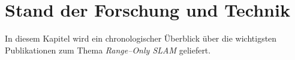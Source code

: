 %
%
%
%
\begin{comment}
------------------------------------------------------------------------------------------
\end{comment}
\chapter{Stand der Forschung und Technik}

In diesem Kapitel wird ein chronologischer Überblick über die wichtigsten Publikationen zum Thema \textit{Range--Only SLAM} geliefert.


